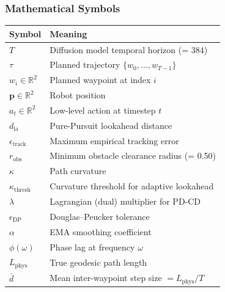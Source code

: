 \documentclass[12pt, a4paper, oneside]{report}
\theoremstyle{definition}
\newcommand{\dlookahead}{d_{\mathrm{la}}}
\newcommand{\R}{\mathbb{R}}
\begin{document}
\vspace{0.8em}
\subsubsection*{Mathematical Symbols}

\begin{center}
\begin{tabularx}{0.85\linewidth}{@{}lX@{}}
  \toprule
  \textbf{Symbol} & \textbf{Meaning} \\
  \midrule
  $T$                          & Diffusion model temporal horizon (= 384) \\
  $\tau$                       & Planned trajectory $\{w_0,\ldots,w_{T-1}\}$ \\
  $w_i \in \R^2$               & Planned waypoint at index $i$ \\
  $\mathbf{p} \in \R^2$        & Robot position \\
  $a_t \in \R^2$               & Low-level action at timestep $t$ \\
  $\dlookahead$                & Pure-Pursuit lookahead distance \\
  $\epsilon_{\mathrm{track}}$  & Maximum empirical tracking error \\
  $r_{\mathrm{obs}}$           & Minimum obstacle clearance radius (= 0.50) \\
  $\kappa$                     & Path curvature \\
  $\kappa_{\mathrm{thresh}}$   & Curvature threshold for adaptive lookahead \\
  $\lambda$                    & Lagrangian (dual) multiplier for PD-CD \\
  $\epsilon_{\mathrm{DP}}$     & Douglas--Peucker tolerance \\
  $\alpha$                     & EMA smoothing coefficient \\
  $\phi(\omega)$               & Phase lag at frequency $\omega$ \\
  $L_{\mathrm{phys}}$          & True geodesic path length \\
  $\bar{d}$                    & Mean inter-waypoint step size $= L_{\mathrm{phys}}/T$ \\
  \bottomrule
\end{tabularx}
\end{center}

\cleardoublepage

\end{document}
